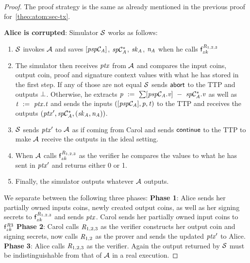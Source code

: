 \begin{proof}
    The proof strategy is the same as already mentioned in the previous proof for~\cref{theo:atom:sec-tx}.

    \textbf{Alice is corrupted}: Simulator $\mathcal{S}$ works as follows:
    \begin{enumerate}
        \item $\mathcal{S}$ invokes $\mathcal{A}$ and saves $[\mathit{psp}\mathcal{C}_{\mathit{A}}]$, $\mathit{sp}\mathcal{C}_{\mathit{A}}^*$, $\mathit{sk}_{\mathit{A}}$, $\mathit{\mathit{n}_{\mathit{A}}}$ when he calls $\mathsf{f}^{\mathit{R}_{1,2,3}}_{zk}$
        \item The simulator then receives $\mathit{ptx}$ from $\mathcal{A}$ and compares the input coins, output coin, proof and signature context values with what he has stored in the first step.
        If any of those are not equal $\mathcal{S}$ sends $\mathsf{abort}$ to the TTP and outputs $\bot$.
        Otherwise, he extracts $\mathit{p} ~:=~ \sum [\mathit{psp}\mathcal{C}_{\mathit{A}}.\mathit{v}] ~-~ \mathit{sp}\mathcal{C}_{\mathit{A}}^*.\mathit{v}$ as well as $\mathit{t} ~:=~ \mathit{ptx}.\mathit{t}$ and sends the inputs $([\mathit{psp}\mathcal{C}_{\mathit{A}}], \mathit{p}, \mathit{t})$ to the TTP and receives the outputs $({\mathit{ptx}}', \mathit{sp}\mathcal{C}_{\mathit{A}}^*, (\mathit{sk}_{\mathit{A}}, \mathit{\mathit{n}_{\mathit{A}}}))$.
        \item $\mathcal{S}$ sends ${\mathit{ptx}}'$ to $\mathcal{A}$ as if coming from Carol and sends $\mathsf{continue}$ to the TTP to make $\mathcal{A}$ receive the outputs in the ideal setting.
        \item When $\mathcal{A}$ calls $\mathsf{f}^{\mathit{R}_{1,2,3}}_{zk}$ as the verifier he compares the values to what he has sent in ${\mathit{ptx}}'$ and returns either 0 or 1.
        \item Finally, the simulator outputs whatever $\mathcal{A}$ outputs.
    \end{enumerate}
    We separate between the following three phases:
    \textbf{Phase 1}: Alice sends her partially owned inputs coins, newly created output coins, as well as her signing secrets to $\mathsf{f}^{\mathit{R}_{1,2,3}}_{zk}$ and sends $\mathit{ptx}$.
    Carol sends her partially owned input coins to $\mathsf{f}^{\mathit{R}{3}}_{zk}$
    \textbf{Phase 2}: Carol calls $\mathit{R}_{1,2,3}$ as the verifier constructs her output coin and signing secrets, now calls $\mathit{R}_{1,2}$ as the prover and sends the updated ${\mathit{ptx}}'$ to Alice.
    \textbf{Phase 3}: Alice calls $\mathit{R}_{1,2,3}$ as the verifier.
    Again the output returned by $\mathcal{S}$ must be indistinguishable from that of $\mathcal{A}$ in a real execution.


\end{proof}
